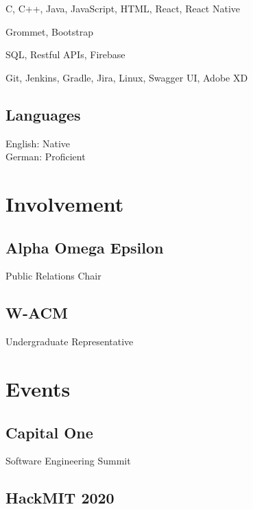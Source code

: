 \documentclass[]{hieudo-build}
\begin{document}
\begin{minipage}[t]{0.34\textwidth}
C, C++, Java, JavaScript, HTML, React, React Native\\ 
\smallsectionsep

Grommet, Bootstrap \\
\smallsectionsep

SQL, Restful APIs, Firebase \\
\smallsectionsep

Git, Jenkins, Gradle, Jira, Linux, Swagger UI, Adobe XD\\
\sectionsep

\subsection{Languages}
\smallsectionsep
English: Native \\
German: Proficient \\
\sectionsep

\section{Involvement}

\subsection{Alpha Omega Epsilon}
Public Relations Chair \\
\smallsectionsep

\subsection{W-ACM}
Undergraduate Representative \\

\sectionsep

\section{Events}
\subsection{Capital One} 
Software Engineering Summit \\
\smallsectionsep
\subsection{HackMIT 2020}
\sectionsep



\end{minipage}
\end{document}
